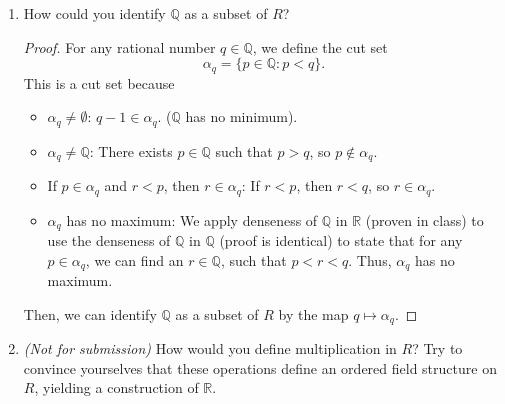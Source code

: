 \documentclass[10pt]{article}
\newcommand{\R}{\mathbb{R}}
\newcommand{\Q}{\mathbb{Q}}
\newenvironment{problem}[2][Problem]{\begin{trivlist}
\item[\hskip \labelsep {\bfseries #1}\hskip \labelsep {\bfseries #2.}]}{\end{trivlist}}
\begin{document}
\begin{problem}{2}
\begin{enumerate}
\begin{proof}
\begin{itemize}
            \end{itemize}
        \end{proof}
		\item How could you identify $ \Q $ as a subset of $ R $?
            \begin{proof}
                For any rational number $q \in \Q$, we define the cut set
                \[ \alpha_q = \{ p \in \Q : p < q \}. \]
                This is a cut set because
                \begin{itemize}
                    \item $\alpha_q \neq \emptyset$: $q-1 \in \alpha_q$. ($\Q$ has no minimum).
                    \item $\alpha_q \neq \Q$: There exists $p \in \Q$ such that $p > q$, so $p \notin \alpha_q$.
                    \item If $p \in \alpha_q$ and $r < p$, then $r \in \alpha_q$: If $r < p$, then $r < q$, so $r \in \alpha_q$.
                    \item $\alpha_q$ has no maximum: We apply denseness of $\Q$ in $\R$ (proven in class) to use the denseness of $\Q$ in $\Q$ (proof is identical) to state that for any $p \in \alpha_q$, we can find an $r \in \Q$, such that $p < r < q$. Thus, $\alpha_q$ has no maximum.
                \end{itemize}
                Then, we can identify $\Q$ as a subset of $R$ by the map $q \mapsto \alpha_q$.
            \end{proof}
		\item \emph{(Not for submission)} How would you define multiplication in $ R $? Try to convince yourselves that these operations define an ordered field structure on $ R $, yielding a construction of $ \R $.
	\end{enumerate}
\end{problem}
\medskip

\newpage
\end{document}
